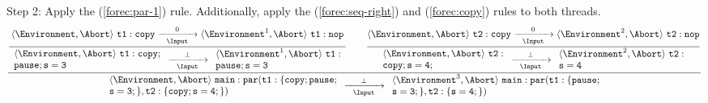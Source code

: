 \noindent
Step 2: Apply the (\ref{forec:par-1}) rule. Additionally, apply
the (\ref{forec:seq-right}) and (\ref{forec:copy}) rules to both threads.
\begin{equation*}
	\frac{
		\dfrac{
				\langle \Environment, \Abort \rangle ~ \mathtt{t1: copy}
					\xrightarrow[~~\Input~~]{0} 
				\langle \Environment^1, \Abort \rangle ~ \mathtt{t1: nop}
			}{
				\begin{array}{l}
					\langle \Environment, \Abort \rangle ~ \mathtt{t1: copy;}				\\
					\mathtt{pause; s=3}
				\end{array}
					\xrightarrow[~~\Input~~]{\bot} 
				\begin{array}{l}
					\langle \Environment^1, \Abort \rangle ~ \mathtt{t1:}					\\
					\mathtt{pause; s=3}
				\end{array}
			}
			\qquad
		\dfrac{
				\langle \Environment, \Abort \rangle ~ \mathtt{t2: copy}
					\xrightarrow[~~\Input~~]{0} 
				\langle \Environment^2, \Abort \rangle ~ \mathtt{t2: nop}
			}{
				\begin{array}{l}
					\langle \Environment, \Abort \rangle ~ \mathtt{t2:}						\\
					\mathtt{copy; s=4;}
				\end{array}
					\xrightarrow[~~\Input~~]{\bot} 
				\begin{array}{l}
					\langle \Environment^2, \Abort \rangle ~ \mathtt{t2:}					\\
					\mathtt{s=4}
				\end{array}
			}
		}{
			\begin{array}{l}
				\langle \Environment, \Abort \rangle ~ \mathtt{main: par(t1:\{copy; pause;}	\\
				\mathtt{s=3;\},t2:\{copy; s=4;\})}
			\end{array}
				\xrightarrow[~~\Input~~]{\bot} 
			\begin{array}{l}
				\langle \Environment^3, \Abort \rangle ~ \mathtt{main: par(t1:\{pause;}		\\
				\mathtt{s=3;\},t2:\{s=4;\})}
			\end{array}
		}
\end{equation*}

